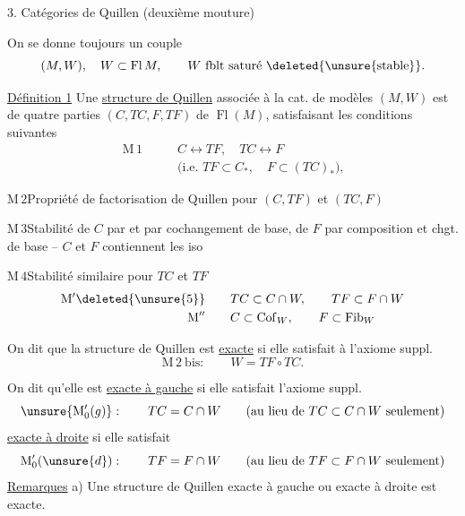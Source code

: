 3. Catégories de Quillen (deuxième mouture)

On se donne toujours un couple
\[
(M,W),\quad W\subset\operatorname{Fl}M,\qquad W\ \text{fblt saturé}\ \deleted{\text{\unsure{stable}}}.
\]

\uline{Définition 1}\unsure{:} Une \uline{structure de Quillen} \uline{} associée à la cat. de modèles $(M,W)$ est   de quatre parties $(C,TC,F,TF)$ de $\operatorname{Fl}(M)$, satisfaisant les conditions suivantes
\[
\begin{aligned}
\mathrm{M}\,1\qquad & C\longleftrightarrow TF,\quad TC\longleftrightarrow F\\
&\text{(i.e. }TF\subset C_{*},\quad F\subset(TC)_{*}\text{),}
\end{aligned}
\]

$\mathrm{M}\,2$\qquad Propriété de factorisation de Quillen pour $(C,TF)$ et $(TC,F)$

$\mathrm{M}\,3$\qquad Stabilité de $C$ par  et par cochangement de base, de $F$ par composition et chgt. de base -- $C$ et $F$ contiennent les iso

$\mathrm{M}\,4$\qquad Stabilité similaire pour $TC$ et $TF$
\[
\begin{aligned}
\mathrm{M}'\deleted{\unsure{5}}\qquad & TC\subset C\cap W,\qquad TF\subset F\cap W\\
\mathrm{M}''\qquad & C\subset\operatorname{Cof}_{W},\qquad F\subset\operatorname{Fib}_{W}
\end{aligned}
\]

On dit que la structure de Quillen est \uline{exacte} si elle satisfait à l'axiome suppl.
\[
\mathrm{M}\,2\ \mathrm{bis}:\qquad W=TF\circ TC.
\]

On dit qu'elle est \uline{exacte à gauche} si elle satisfait l'axiome suppl.
\[
\unsure{\mathrm M'_0(g)}:\qquad TC=C\cap W\qquad \text{(au lieu de }TC\subset C\cap W\text{ seulement)}
\]
\uline{exacte à droite} si elle satisfait
\[
\mathrm M'_0(\unsure{d}):\qquad TF=F\cap W\qquad \text{(au lieu de }TF\subset F\cap W\text{ seulement)}
\]
\uline{Remarques} a) Une structure de Quillen exacte à gauche ou exacte à droite est exacte.

